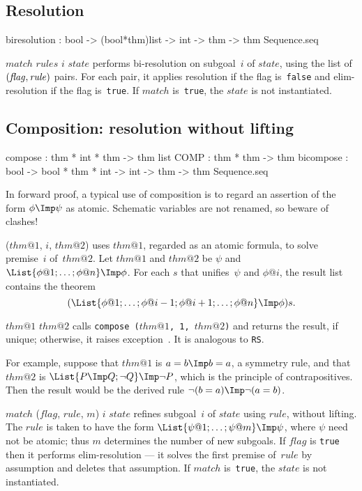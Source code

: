 \subsection{Resolution}
\begin{ttbox} 
biresolution : bool -> (bool*thm)list -> int -> thm
               -> thm Sequence.seq
\end{ttbox}
\begin{ttdescription}
\item[\ttindexbold{biresolution} $match$ $rules$ $i$ $state$] 
performs bi-resolution on subgoal~$i$ of $state$, using the list of $\it
(flag,rule)$ pairs.  For each pair, it applies resolution if the flag
is~{\tt false} and elim-resolution if the flag is~{\tt true}.  If $match$
is~{\tt true}, the $state$ is not instantiated.
\end{ttdescription}


\subsection{Composition: resolution without lifting}
\begin{ttbox}
compose   : thm * int * thm -> thm list
COMP      : thm * thm -> thm
bicompose : bool -> bool * thm * int -> int -> thm
            -> thm Sequence.seq
\end{ttbox}
In forward proof, a typical use of composition is to regard an assertion of
the form $\phi\Imp\psi$ as atomic.  Schematic variables are not renamed, so
beware of clashes!
\begin{ttdescription}
\item[\ttindexbold{compose} ($thm@1$, $i$, $thm@2$)] 
uses $thm@1$, regarded as an atomic formula, to solve premise~$i$
of~$thm@2$.  Let $thm@1$ and $thm@2$ be $\psi$ and $\List{\phi@1; \ldots;
\phi@n} \Imp \phi$.  For each $s$ that unifies~$\psi$ and $\phi@i$, the
result list contains the theorem
\[ (\List{\phi@1; \ldots; \phi@{i-1}; \phi@{i+1}; \ldots; \phi@n} \Imp \phi)s.
\]

\item[$thm@1$ \ttindexbold{COMP} $thm@2$] 
calls \hbox{\tt compose ($thm@1$, 1, $thm@2$)} and returns the result, if
unique; otherwise, it raises exception~\@.  It is
analogous to {\tt RS}\@.  

For example, suppose that $thm@1$ is $a=b\Imp b=a$, a symmetry rule, and
that $thm@2$ is $\List{P\Imp Q; \neg Q} \Imp\neg P$, which is the
principle of contrapositives.  Then the result would be the
derived rule $\neg(b=a)\Imp\neg(a=b)$.

\item[\ttindexbold{bicompose} $match$ ($flag$, $rule$, $m$) $i$ $state$]
refines subgoal~$i$ of $state$ using $rule$, without lifting.  The $rule$
is taken to have the form $\List{\psi@1; \ldots; \psi@m} \Imp \psi$, where
$\psi$ need not be atomic; thus $m$ determines the number of new
subgoals.  If $flag$ is {\tt true} then it performs elim-resolution --- it
solves the first premise of~$rule$ by assumption and deletes that
assumption.  If $match$ is~{\tt true}, the $state$ is not instantiated.
\end{ttdescription}



